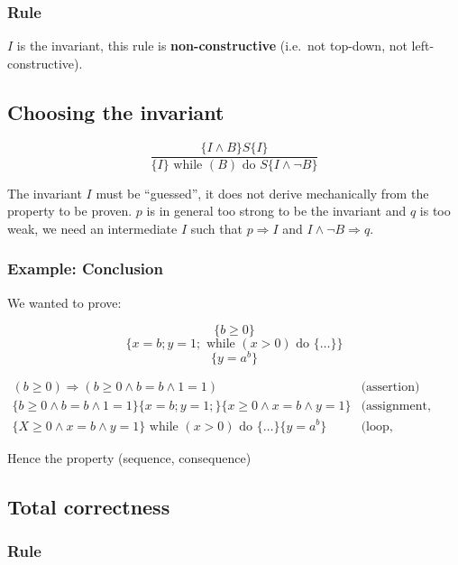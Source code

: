 \documentclass[12pt, a4paper]{book}
\begin{document}
    \subsubsection{Rule}

    $I$ is the invariant, this rule is \textbf{non-constructive} (i.e.\ not
    top-down, not left-constructive).

    \subsection{Choosing the invariant}

    $$
    \frac
    { \{ I \land B \} S \{ I \} }
    { \{ I \} \textrm{ while } (B) \textrm{ do } S \{ I \land \lnot B \} }
    $$

    The invariant $I$ must be \enquote{guessed}, it does not derive mechanically
    from the property to be proven. $p$ is in general too strong to be the
    invariant and $q$ is too weak, we need an intermediate $I$ such that
    $p \Rightarrow I$ and $I \land \lnot B \Rightarrow q$.

    \subsubsection{Example: Conclusion}

    We wanted to prove:

    $$
    \{ b \ge 0 \}
    $$
    $$
    \{ x =b ; y=1; \textrm{ while } (x>0) \textrm{ do } \{ \ldots \} \}
    $$
    $$
    \{ y = {a}^{b} \}
    $$

    \begin{eqnarray*}
        (b \ge 0) \Rightarrow (b \ge 0 \land b =b \land 1 = 1) & \textrm{(assertion)} \\
        \{ b \ge 0 \land b = b \land 1 = 1 \} \{ x=b; y=1; \} \{ x \ge 0 \land x = b \land y = 1 \} & \textrm{(assignment, sequence)} \\
        \{ X \ge 0 \land x =b \land y = 1 \} \textrm{ while } (x>0) \textrm{ do } \{ \ldots \} \{ y = {a}^{b} \} & \textrm{(loop, consequence)}
    \end{eqnarray*}

    Hence the property (sequence, consequence)

    \subsection{Total correctness}

    \subsubsection{Rule}
\end{document}
